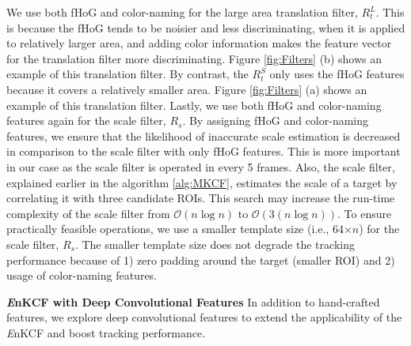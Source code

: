 \documentclass[10pt,twocolumn,letterpaper]{article}
\begin{document}
We use both fHoG \cite{felzenszwalb2010object} and color-naming
\cite{van2009learning} for the large area translation filter,
$R_{t}^{L}$. This is because the fHoG tends to be noisier and less
discriminating, when it is applied to relatively larger area, and
adding color information makes the feature vector for the translation
filter more discriminating. Figure \ref{fig:Filters} (b) shows an
example of this translation filter. By contrast, the $R_{t}^{S}$ only
uses the fHoG features because it covers a relatively smaller area.
Figure \ref{fig:Filters} (a) shows an example of this translation
filter. Lastly, we use both fHoG and color-naming features again for
the scale filter, $R_{s}$. By assigning fHoG and color-naming
features, we ensure that the likelihood of inaccurate scale estimation
is decreased in comparison to the scale filter with only fHoG
features. This is more important in our case as the scale filter is
operated in every 5 frames. Also, the scale filter, explained earlier
in the algorithm \ref{alg:MKCF}, estimates the scale of a target by
correlating it with three candidate ROIs. This search may increase the
run-time complexity of the scale filter from $\mathcal{O}(n\log n)$ to
$\mathcal{O}(3(n\log n))$. To ensure practically feasible operations,
we use a smaller template size (i.e., 64$\times n$) for the scale
filter, $R_{s}$. The smaller template size does not degrade the
tracking performance because of 1) zero padding around the target
(smaller ROI) and 2) usage of color-naming features.

\textbf{{\it E}nKCF with Deep Convolutional Features} In addition to
hand-crafted features, we explore deep convolutional features to
extend the applicability of the {\it E}nKCF and boost tracking
performance.
\end{document}
